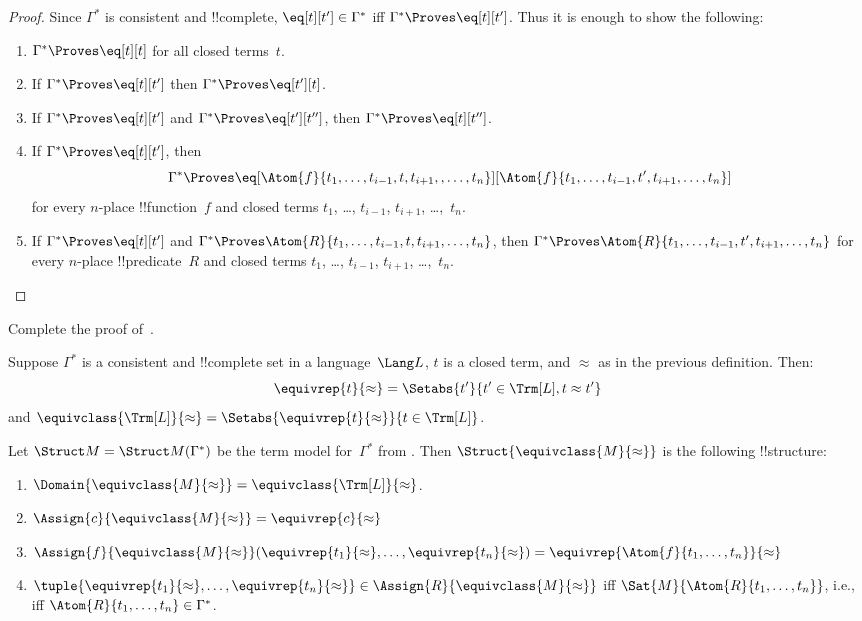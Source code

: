 \begin{proof}
Since $\Gamma^*$ is consistent and !!{complete}, $\eq[t][t'] \in
\Gamma^*$ iff $\Gamma^* \Proves \eq[t][t']$.  Thus it is enough to
show the following:
\begin{enumerate}
\item $\Gamma^* \Proves \eq[t][t]$ for all closed terms~$t$.
\item If $\Gamma^* \Proves \eq[t][t']$ then $\Gamma^* \Proves \eq[t'][t]$.
\item If $\Gamma^* \Proves \eq[t][t']$ and $\Gamma^* \Proves
  \eq[t'][t'']$, then $\Gamma^* \Proves \eq[t][t'']$.
\item If $\Gamma^* \Proves \eq[t][t']$, then
\[
\Gamma^* \Proves
\eq[\Atom{f}{t_1,\dots,t_{i-1},t,t_{i+1},,\dots,t_n}][\Atom{f}{t_1,\dots,t_{i-1},t',t_{i+1},\dots,t_n}]
\]
for every $n$-place !!{function}~$f$ and closed terms $t_1$, \dots,
$t_{i-1}$, $t_{i+1}$, \dots,~$t_n$.
\item If $\Gamma^* \Proves \eq[t][t']$ and
$\Gamma^* \Proves
\Atom{R}{t_1,\dots,t_{i-1},t,t_{i+1},\dots,t_n}$, then
$\Gamma^* \Proves \Atom{R}{t_1,\dots,t_{i-1},t',t_{i+1},\dots,t_n}$
for every $n$-place !!{predicate}~$R$ and closed terms $t_1$, \dots,
$t_{i-1}$, $t_{i+1}$, \dots,~$t_n$.
\end{enumerate}
\end{proof}

\begin{prob}
Complete the proof of~.
\end{prob}

\begin{defn}
Suppose $\Gamma^*$ is a consistent and !!{complete} set in a
language~$\Lang L$, $t$ is a closed term, and $\approx$ as in the
previous definition. Then:
\[
\equivrep{t}{\approx} = \Setabs{t'}{t'\in \Trm[L], t \approx t'}
\]
and $\equivclass{\Trm[L]}{\approx} = \Setabs{\equivrep{t}{\approx}}{t \in \Trm[L]}$.
\end{defn}

\begin{defn}
Let $\Struct M = \Struct M(\Gamma^*)$ be the term model
for~$\Gamma^*$ from .  Then $\Struct{\equivclass{M}{\approx}}$ is the following
!!{structure}:
\begin{enumerate}
\item $\Domain{\equivclass{M}{\approx}} = \equivclass{\Trm[L]}{\approx}$.
\item $\Assign{c}{\equivclass{M}{\approx}} = \equivrep{c}{\approx}$
\item $\Assign{f}{\equivclass{M}{\approx}}(\equivrep{t_1}{\approx}, \dots,
  \equivrep{t_n}{\approx}) = \equivrep{\Atom{f}{t_1,\dots, t_n}}{\approx}$
\item $\tuple{\equivrep{t_1}{\approx}, \dots, \equivrep{t_n}{\approx}} \in
  \Assign{R}{\equivclass{M}{\approx}}$ iff
  $\Sat{M}{\Atom{R}{t_1,\dots, t_n}}$, i.e., iff $\Atom{R}{t_1,\dots,
  t_n} \in \Gamma^*$.
\end{enumerate}
\end{defn}

